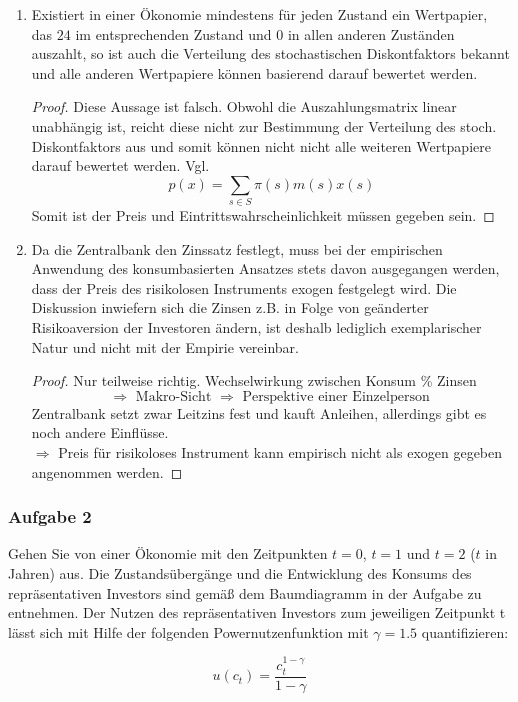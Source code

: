 \documentclass[12pt]{extreport} %
\theoremstyle{named}
\theoremstyle{nnamed}
\theoremstyle{itshape}
\theoremstyle{normal}
\begin{document}
\begin{enumerate}
	\item Existiert in einer Ökonomie mindestens für jeden Zustand ein Wertpapier, das $24$ im entsprechenden Zustand und $0$ in allen anderen Zuständen auszahlt, so ist auch die Verteilung des stochastischen Diskontfaktors bekannt und alle anderen Wertpapiere können basierend darauf bewertet werden.
		\begin{proof}
			Diese Aussage ist falsch. Obwohl die Auszahlungsmatrix linear unabhängig ist, reicht diese nicht zur Bestimmung der Verteilung des stoch. Diskontfaktors aus und somit können nicht nicht alle weiteren Wertpapiere darauf bewertet werden. Vgl.
			$$ p(x) = \sum_{s \in S} \pi(s) m(s) x(s) $$
			Somit ist der Preis und Eintrittswahrscheinlichkeit müssen gegeben sein.
		\end{proof}
	\item  Da die Zentralbank den Zinssatz festlegt, muss bei der empirischen Anwendung des konsumbasierten Ansatzes stets davon ausgegangen werden, dass der Preis des risikolosen Instruments exogen festgelegt wird. Die Diskussion inwiefern sich die Zinsen z.B. in Folge von geänderter Risikoaversion der Investoren ändern, ist deshalb lediglich exemplarischer Natur und nicht mit der Empirie vereinbar. 
		\begin{proof}
			Nur teilweise richtig. Wechselwirkung zwischen Konsum \% Zinsen
				$$ \Rightarrow \text{ Makro-Sicht } \Rightarrow \text{ Perspektive einer Einzelperson } $$
				Zentralbank setzt zwar Leitzins fest und kauft Anleihen, allerdings gibt es noch andere Einflüsse. ~\\
			$\Rightarrow$ Preis für risikoloses Instrument kann empirisch nicht als exogen gegeben angenommen werden.
		\end{proof}
\end{enumerate}

\newpage

\subsubsection*{Aufgabe 2}
Gehen Sie von einer Ökonomie mit den Zeitpunkten $t = 0$, $t = 1$ und $t = 2$ ($t$ in Jahren) aus. Die Zustandsübergänge und die Entwicklung des Konsums des repräsentativen Investors sind gemäß dem Baumdiagramm in der Aufgabe zu entnehmen. Der Nutzen des repräsentativen Investors zum jeweiligen Zeitpunkt t lässt sich mit Hilfe der folgenden Powernutzenfunktion mit $\gamma = 1.5$ quantifizieren:

$$ u(c_t) = \frac{c_t^{1-\gamma}}{1 - \gamma} $$
\end{document}

